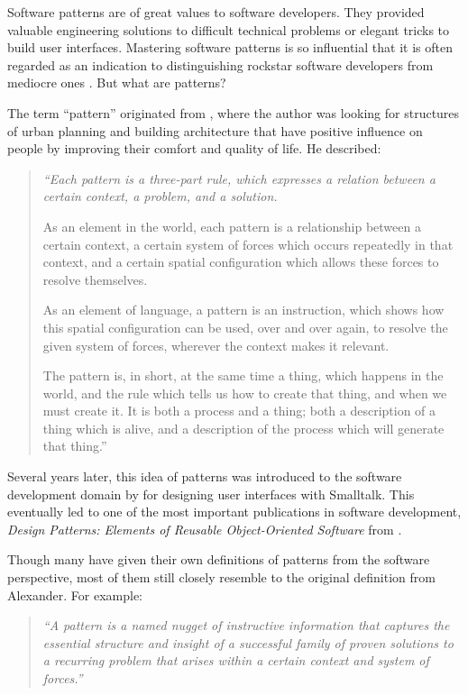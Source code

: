 \documentclass[a4paper,titlepage]{article}
\begin{document}
Software patterns are of great values to software developers. They
provided valuable engineering solutions to difficult technical
problems or elegant tricks to build user interfaces. Mastering
software patterns is so influential that it is often regarded as an
indication to distinguishing rockstar software developers from
mediocre ones \citep{rockstar:iskold}. But what are patterns?

The term ``pattern'' originated from \citet{timeless:alexander}, where
the author was looking for structures of urban planning and building
architecture that have positive influence on people by improving their
comfort and quality of life. He described:
\begin{quote}
  {\it ``Each pattern is a three-part rule, which expresses a relation
    between a certain context, a problem, and a solution.

    As an element in the world, each pattern is a relationship between
    a certain context, a certain system of forces which occurs
    repeatedly in that context, and a certain spatial configuration
    which allows these forces to resolve themselves.

    As an element of language, a pattern is an instruction, which
    shows how this spatial configuration can be used, over and over
    again, to resolve the given system of forces, wherever the context
    makes it relevant.

    The pattern is, in short, at the same time a thing, which happens
    in the world, and the rule which tells us how to create that
    thing, and when we must create it. It is both a process and a
    thing; both a description of a thing which is alive, and a
    description of the process which will generate that thing.''}

  \raggedleft \citep[p. 247]{timeless:alexander}
\end{quote}

Several years later, this idea of patterns was introduced to the
software development domain by \citet{patterns:beck} for designing
user interfaces with Smalltalk. This eventually led to one of the most
important publications in software development, \textit{Design
  Patterns: Elements of Reusable Object-Oriented Software} from
\citet{patterns:gamma}.

Though many have given their own definitions of patterns from the
software perspective, most of them still closely resemble to the
original definition from Alexander. For example:
\begin{quote}
  {\it ``A pattern is a named nugget of instructive information that
    captures the essential structure and insight of a successful
    family of proven solutions to a recurring problem that arises
    within a certain context and system of forces.''}

  \raggedleft \citet{patterns:appleton}
\end{quote}
\end{document}

